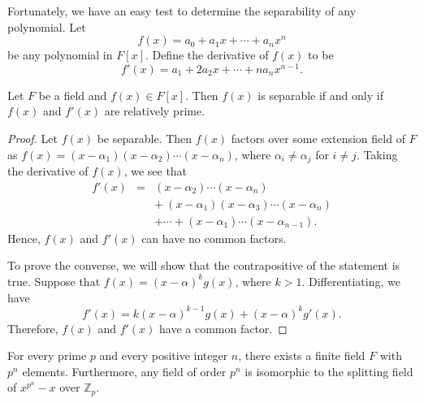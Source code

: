 \medskip

Fortunately, we have an easy test to  determine the separability of any polynomial.  Let
$$
f(x) = a_0 + a_1 x + \cdots + a_n x^n
$$
be any polynomial in  $F[x]$. Define the {\bfi derivative\/} of $f(x)$ to be 
$$
f'(x) = a_1  + 2 a_2 x + \cdots + n a_n x^{n-1}.
$$


\begin{lemma}
Let $F$ be a field and $f(x) \in F[x]$.  Then $f(x)$ is separable if and only if $f(x)$ and $f'(x)$ are relatively prime. 
\end{lemma}


\begin{proof}
Let $f(x)$ be separable.  Then $f(x)$ factors over some extension field of $F$ as $f(x) = (x - \alpha_1) (x - \alpha_2) \cdots (x - \alpha_n)$, where $\alpha_i \neq \alpha_j$ for $i \neq j$. Taking the derivative
of $f(x)$, we see that
\begin{eqnarray*}
f'(x) & = & (x - \alpha_2) \cdots (x - \alpha_n) \\
& & + \: (x - \alpha_1) (x - \alpha_3) \cdots (x - \alpha_n) \\
& & + \cdots + (x - \alpha_1) \cdots (x - \alpha_{n - 1}).
\end{eqnarray*}
Hence, $f(x)$ and $f'(x)$ can have no common factors.

To prove the converse, we will show that the contrapositive of the statement is true.  Suppose that $f(x) = (x - \alpha)^k g(x)$, where $k > 1$.  Differentiating, we have
$$
f'(x) = k ( x - \alpha)^{k-1} g(x) + (x- \alpha)^k g'(x).
$$
Therefore, $f(x)$ and $f'(x)$ have a common factor.
\end{proof}


\begin{theorem} 
For every  prime $p$ and every positive integer $n$, there exists a finite field $F$ with $p^n$ elements. Furthermore, any field of order $p^n$ is isomorphic to the splitting field of $x^{p^n} -x$ over ${\mathbb Z}_p$.
\end{theorem}
 

